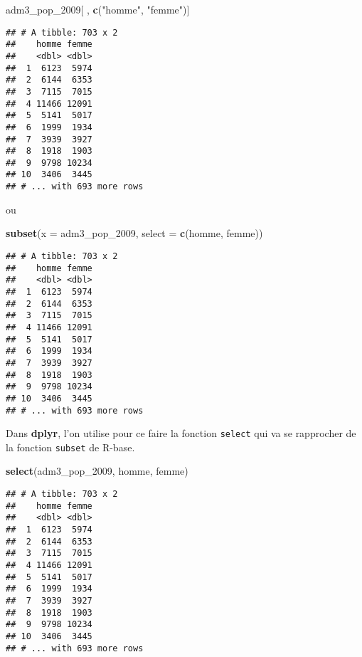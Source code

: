 \documentclass[]{book}
\newenvironment{Shaded}{\begin{snugshade}}{\end{snugshade}}
\newcommand{\KeywordTok}[1]{\textcolor[rgb]{0.13,0.29,0.53}{\textbf{#1}}}
\newcommand{\DataTypeTok}[1]{\textcolor[rgb]{0.13,0.29,0.53}{#1}}
\newcommand{\DecValTok}[1]{\textcolor[rgb]{0.00,0.00,0.81}{#1}}
\newcommand{\StringTok}[1]{\textcolor[rgb]{0.31,0.60,0.02}{#1}}
\newcommand{\NormalTok}[1]{#1}
\begin{document}
\begin{Shaded}
\begin{Highlighting}[]
\NormalTok{adm3_pop_}\DecValTok{2009}\NormalTok{[ , }\KeywordTok{c}\NormalTok{(}\StringTok{"homme"}\NormalTok{, }\StringTok{"femme"}\NormalTok{)]}
\end{Highlighting}
\end{Shaded}

\begin{verbatim}
## # A tibble: 703 x 2
##    homme femme
##    <dbl> <dbl>
##  1  6123  5974
##  2  6144  6353
##  3  7115  7015
##  4 11466 12091
##  5  5141  5017
##  6  1999  1934
##  7  3939  3927
##  8  1918  1903
##  9  9798 10234
## 10  3406  3445
## # ... with 693 more rows
\end{verbatim}

ou

\begin{Shaded}
\begin{Highlighting}[]
\KeywordTok{subset}\NormalTok{(}\DataTypeTok{x =}\NormalTok{ adm3_pop_}\DecValTok{2009}\NormalTok{, }\DataTypeTok{select =} \KeywordTok{c}\NormalTok{(homme, femme))}
\end{Highlighting}
\end{Shaded}

\begin{verbatim}
## # A tibble: 703 x 2
##    homme femme
##    <dbl> <dbl>
##  1  6123  5974
##  2  6144  6353
##  3  7115  7015
##  4 11466 12091
##  5  5141  5017
##  6  1999  1934
##  7  3939  3927
##  8  1918  1903
##  9  9798 10234
## 10  3406  3445
## # ... with 693 more rows
\end{verbatim}

Dans \textbf{dplyr}, l'on utilise pour ce faire la fonction
\texttt{select} qui va se rapprocher de la fonction \texttt{subset} de
R-base.

\begin{Shaded}
\begin{Highlighting}[]
\KeywordTok{select}\NormalTok{(adm3_pop_}\DecValTok{2009}\NormalTok{, homme, femme)}
\end{Highlighting}
\end{Shaded}

\begin{verbatim}
## # A tibble: 703 x 2
##    homme femme
##    <dbl> <dbl>
##  1  6123  5974
##  2  6144  6353
##  3  7115  7015
##  4 11466 12091
##  5  5141  5017
##  6  1999  1934
##  7  3939  3927
##  8  1918  1903
##  9  9798 10234
## 10  3406  3445
## # ... with 693 more rows
\end{verbatim}
\end{document}
